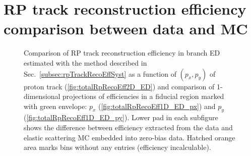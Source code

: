 
\chapter{RP track reconstruction efficiency comparison between data and MC}\label{appendix:rpTrackRecoEffSyst}\vspace{-26pt}


\begin{figure}[h]%
	\centering
	\parbox{0.54\textwidth}{
		\centering
		\begin{subfigure}[b]{\linewidth}{\vspace{10pt}
				}
		\end{subfigure}
		\begin{minipage}[t][0.64\linewidth][t]{\linewidth}\vspace{10pt}
		\caption[Coparison of estimated RP track reconstruction efficiency in 2D and 1D (branch ED).]%
		{Comparison of RP track reconstruction efficiency in branch ED estimated with the method described in Sec.~\ref{subsec:rpTrackRecoEffSyst} as a function of $(p_{x},p_{y})$ of proton track (\ref{fig:totalRpRecoEff2D_ED}) and comparison of 1-dimensional projections of efficiencies in a fiducial region marked with green envelope: $p_{x}$ (\ref{fig:totalRpRecoEff1D_ED_px}) and $p_{y}$ (\ref{fig:totalRpRecoEff1D_ED_py}). Lower pad in each subfigure shows the difference between efficiency extracted from the data and elastic scattering MC embedded into zero-bias data. Hatched orange area marks bins without any entries (efficiency incalculable).}\label{fig:totalRpRecoEff_ED}

\end{minipage}}
\end{figure}
